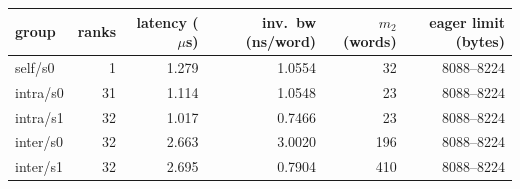 \begin{tabular}{lrrrrr}
\toprule
group & ranks & latency ($\mu$s) & inv.\ bw (ns/word) & $m_2$ (words) & eager limit (bytes) \\
\midrule
self/s0 & 1 & 1.279 & 1.0554 & 32 & 8088--8224 \\
intra/s0 & 31 & 1.114 & 1.0548 & 23 & 8088--8224 \\
intra/s1 & 32 & 1.017 & 0.7466 & 23 & 8088--8224 \\
inter/s0 & 32 & 2.663 & 3.0020 & 196 & 8088--8224 \\
inter/s1 & 32 & 2.695 & 0.7904 & 410 & 8088--8224 \\
\bottomrule
\end{tabular}
